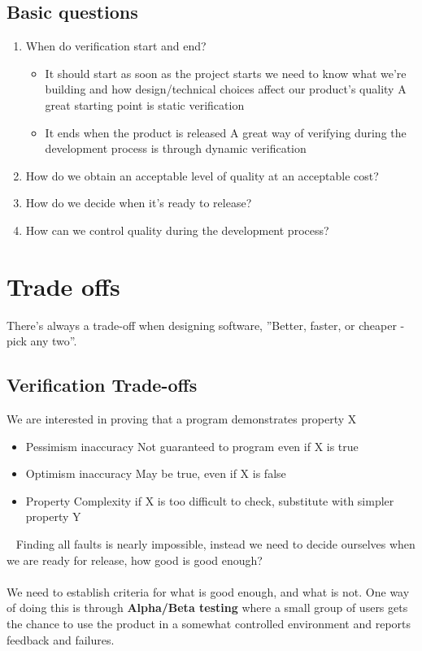 \subsection{Basic questions}
\begin{enumerate}
	\item When do verification start and end?
	      \begin{itemize}
		      \item It should start as soon as the project starts
		            \subitem we need to know what we're building and how design/technical choices affect our product's quality
		            \subitem A great starting point is static verification %
		      \item It ends when the product is released
		            \subitem A great way of verifying during the development process is through dynamic verification %
	      \end{itemize}
	\item How do we obtain an acceptable level of quality at an acceptable cost?
	\item How do we decide when it's ready to release?
	\item How can we control quality during the development process?
\end{enumerate}

\section{Trade offs}
There's always a trade-off when designing software, ''Better, faster, or cheaper - pick any two''.
\subsection{Verification Trade-offs}
We are interested in proving that a program demonstrates property X
\begin{itemize}
	\item Pessimism inaccuracy
	      \subitem Not guaranteed to program even if X is true
	\item Optimism inaccuracy
	      \subitem May be true, even if X is false
	\item Property Complexity
	      \subitem if X is too difficult to check, substitute with simpler property Y
\end{itemize}
~
Finding all faults is nearly impossible, instead we need to decide ourselves when we are ready for release, how good is good enough?\\
\\
We need to establish criteria for what is good enough, and what is not. One way of doing this is through \textbf{Alpha/Beta testing} where a small group of users gets the chance to use the product in a somewhat controlled environment and reports feedback and failures.\\
